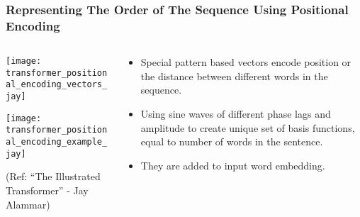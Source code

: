 \begin{frame}[fragile]\frametitle{Representing The Order of The Sequence Using Positional Encoding}


\begin{columns}
    \begin{column}[T]{0.5\linewidth}
\begin{center}
\texttt{[image: transformer\_positional\_encoding\_vectors\_jay]}

\texttt{[image: transformer\_positional\_encoding\_example\_jay]}


{\tiny (Ref: ``The Illustrated Transformer'' - Jay Alammar)}
\end{center}		

		\end{column}
    \begin{column}[T]{0.5\linewidth}

\begin{itemize}
\item Special pattern based vectors encode position or the distance between different words in the sequence. 
\item Using sine waves of different phase lags and amplitude to create unique set of basis functions, equal to number of words in the sentence.
\item They are added to input word embedding.
\end{itemize}
    \end{column}
  \end{columns}
\end{frame}



